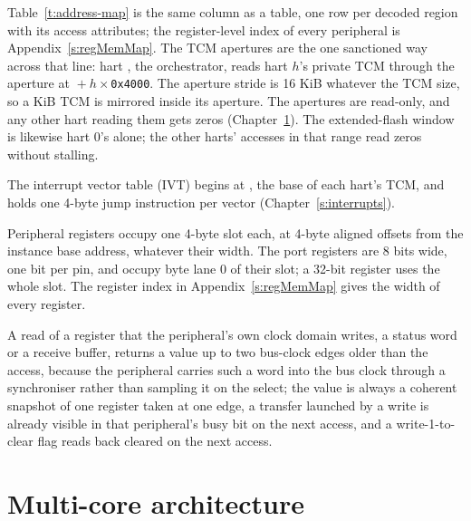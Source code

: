 \documentclass[11pt,pdftex,openany,letterpaper]{report}
\begin{document}
Table~\ref{t:address-map} is the same column as a table, one row per decoded region with its access attributes; the register-level index of every peripheral is Appendix~\ref{s:regMemMap}.
\iforchpresent
The TCM apertures are the one sanctioned way across that line: hart \OrchHartIndex, the orchestrator, reads hart $h$'s private TCM through the aperture at \texttt{\FirstTcmWindowAddress}${} + h \times{}$\texttt{0x4000}. The aperture stride is 16 KiB whatever the TCM size, so a \TcmSizeKiB{} KiB TCM is mirrored inside its aperture. The apertures are read-only, and any other hart reading them gets zeros (Chapter~\ref{s:multicore}).
\fi
The extended-flash window is likewise hart 0's alone; the other harts' accesses in that range read zeros without stalling.

The interrupt vector table (IVT) begins at \texttt{\VectorsStartAddress}, the base of each hart's TCM, and holds one 4-byte jump instruction per vector (Chapter~\ref{s:interrupts}).

Peripheral registers occupy one 4-byte slot each, at 4-byte aligned offsets from the instance base address, whatever their width. The  port registers are 8 bits wide, one bit per pin, and occupy byte lane 0 of their slot; a 32-bit register uses the whole slot. The register index in Appendix~\ref{s:regMemMap} gives the width of every register.

A read of a register that the peripheral's own clock domain writes, a status word or a receive buffer, returns a value up to two bus-clock edges older than the access, because the peripheral carries such a word into the bus clock through a synchroniser rather than sampling it on the select; the value is always a coherent snapshot of one register taken at one edge, a transfer launched by a write is already visible in that peripheral's busy bit on the next access, and a write-1-to-clear flag reads back cleared on the next access.

\clearpage



\chapter{Multi-core architecture} \label{s:multicore}
\end{document}
